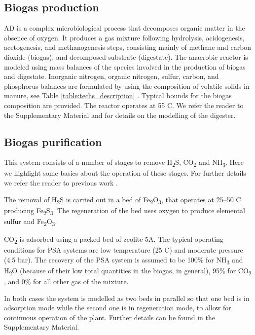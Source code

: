 \begin{refsection}[referencesCh2]
\subsection{Biogas production} \label{section:BiogasProduction}
AD is a complex microbiological process that decomposes organic matter in the absence of oxygen. It produces a gas mixture following hydrolysis, acidogenesis, acetogenesis, and methanogenesis steps, consisting mainly of methane and carbon dioxide (biogas), and decomposed substrate (digestate). The anaerobic reactor is modeled using mass balances of the species involved in the production of biogas and digestate. Inorganic nitrogen, organic nitrogen, sulfur, carbon, and phosphorus balances are formulated by using the composition of volatile solids in manure, see Table \ref{table:techs_description} \citep{kowalski2013changes, Lorimor2004, AlSeadi2008, martins2009biogas}. Typical bounds for the biogas composition are provided. The reactor operates at 55 \textdegree C. We refer the reader to the Supplementary Material and \citet{Leon} for details on the modelling of the digester.

\subsection{Biogas purification} \label{section:BiogasPurification}
This system consists of a number of stages to remove H\textsubscript{2}S, CO\textsubscript{2} and NH\textsubscript{3}. Here we highlight some basics about the operation of these stages. For further details we refer the reader to previous work \citep{Leon}.

The removal of H\textsubscript{2}S is carried out in a bed of Fe\textsubscript{2}O\textsubscript{3}, that operates at 25–50 \textdegree C producing Fe\textsubscript{2}S\textsubscript{3}. The regeneration of the bed
uses oxygen to produce elemental sulfur and Fe\textsubscript{2}O\textsubscript{3}.

CO\textsubscript{2} is adsorbed using a packed bed of zeolite 5A. The typical operating conditions for PSA systems are low temperature (25 \textdegree C) and moderate pressure (4.5 bar). The recovery of the PSA system is assumed to be 100\% for NH\textsubscript{3} and H\textsubscript{2}O (because of their low total quantities in the biogas, in general), 95\% for CO\textsubscript{2} , and 0\% for all other gas of the mixture.

In both cases the system is modelled as two beds in parallel so that one bed is in adsorption mode while the second one is in regeneration mode, to allow for continuous operation of the plant. Further details can be found in the Supplementary Material.


\end{refsection}
